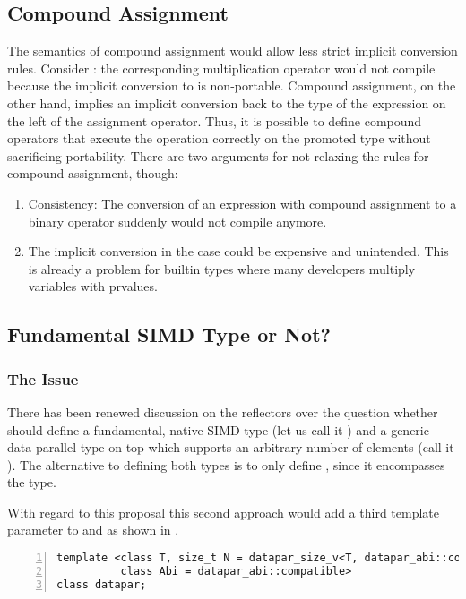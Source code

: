 \subsection{Compound Assignment}
The semantics of compound assignment would allow less strict implicit conversion rules.
Consider : the corresponding multiplication operator would not compile because the implicit conversion to \datapar[<float>] is non-portable.
Compound assignment, on the other hand, implies an implicit conversion back to the type of the expression on the left of the assignment operator.
Thus, it is possible to define compound operators that execute the operation correctly on the promoted type without sacrificing portability.
There are two arguments for not relaxing the rules for compound assignment, though:
\begin{enumerate}
  \item Consistency: The conversion of an expression with compound assignment to a binary operator suddenly would not compile anymore.
  \item The implicit conversion in the  case could be expensive and unintended.
    This is already a problem for builtin types where many developers multiply \float variables with \double prvalues.
\end{enumerate}

\subsection{Fundamental SIMD Type or Not?}
\subsubsection{The Issue}
There has been renewed discussion on the reflectors over the question whether \CC{} should define a fundamental, native SIMD type (let us call it ) and a generic data-parallel type on top which supports an arbitrary number of elements (call it ).
The alternative to defining both types is to only define , since it encompasses the  type.

With regard to this proposal this second approach would add a third template parameter to \datapar and \mask as shown in .
\begin{lstlisting}[style=Vc,numbers=left,float,label=lst:datapar N,caption={
  Possible declaration of the class template parameters of a \datapar class with arbitrary width.
}]
template <class T, size_t N = datapar_size_v<T, datapar_abi::compatible>,
          class Abi = datapar_abi::compatible>
class datapar;
\end{lstlisting}

